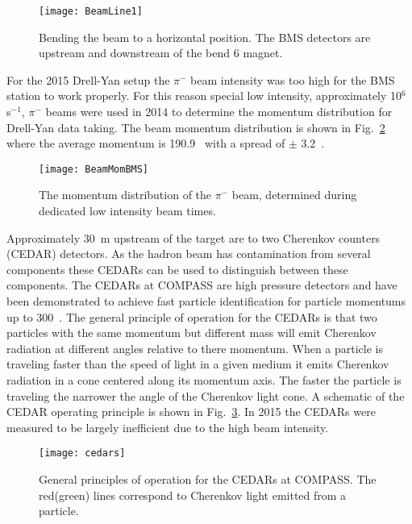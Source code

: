 \begin{figure}[h!t]
  \centering
  \texttt{[image: BeamLine1]}
  \caption{Bending the beam to a horizontal position.  The BMS detectors are
    upstream and downstream of the bend 6 magnet.}
  \label{fig::BeamLine1}
\end{figure}

For the 2015 Drell-Yan setup the $\pi^-$ beam intensity was too high for the BMS
station to work properly.  For this reason special low intensity, approximately
10$^6$ s$^{-1}$, $\pi^-$ beams were used in 2014 to determine the momentum
distribution for Drell-Yan data taking.  The beam momentum distribution is shown
in Fig.~\ref{fig::BeamMomBMS} where the average momentum is 190.9~{\gvc} with a
spread of $\pm$ 3.2~{\gvc}. \par

\begin{figure}[h!t]
  \centering
  \texttt{[image: BeamMomBMS]}
  \caption{The momentum distribution of the $\pi^-$ beam, determined during
    dedicated low intensity beam times.}
  \label{fig::BeamMomBMS}
\end{figure}

Approximately 30~m upstream of the target are to two Cherenkov counters (CEDAR)
detectors.  As the hadron beam has contamination from several components these
CEDARs can be used to distinguish between these components.  The CEDARs at
COMPASS are high pressure detectors and have been demonstrated to achieve fast
particle identification for particle momentums up to 300~{\gvc}.  The general
principle of operation for the CEDARs is that two particles with the same
momentum but different mass will emit Cherenkov radiation at different angles
relative to there momentum.  When a particle is traveling faster than the speed
of light in a given medium it emits Cherenkov radiation in a cone centered along
its momentum axis.  The faster the particle is traveling the narrower the angle
of the Cherenkov light cone.  A schematic of the CEDAR operating principle is
shown in Fig.~\ref{fig::cedars}.  In 2015 the CEDARs were measured to be largely
inefficient due to the high beam intensity.

\begin{figure}[h!t]
  \centering
  \texttt{[image: cedars]}
  \caption{General principles of operation for the CEDARs at COMPASS.  The
    red(green) lines correspond to Cherenkov light emitted from a particle.}
  \label{fig::cedars}
\end{figure}

